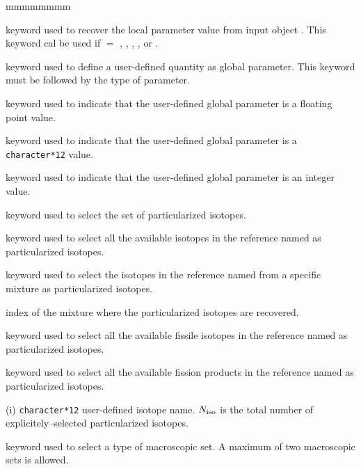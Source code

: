 \begin{ListeDeDescription}{mmmmmmmm}
\item[\moc{BURN}] keyword used to recover the local parameter value from input object .
This keyword cal be used if  $=$ , , , ,  or .

\item[\moc{VALE}] keyword used to define a user-defined quantity as global parameter.
This keyword must be followed by the type of parameter.

\item[\moc{FLOT}] keyword used to indicate that the user-defined global parameter
is a floating point value.

\item[\moc{CHAI}] keyword used to indicate that the user-defined global parameter
is a {\tt character*12} value.

\item[\moc{ENTI}] keyword used to indicate that the user-defined global parameter
is an integer value.

\item[\moc{ISOT}] keyword used to select the set of particularized isotopes.

\item[\moc{TOUT}] keyword used to select all the available isotopes in the reference
 named  as particularized isotopes.

\item[\moc{MILI}] keyword used to select the isotopes in the reference
 named  from a specific mixture as particularized isotopes.

\item[\dusa{imil}] index of the mixture where the particularized isotopes are recovered.

\item[\moc{FISS}] keyword used to select all the available fissile isotopes in the reference
 named  as particularized isotopes.

\item[\moc{PF}] keyword used to select all the available fission products in the reference
 named  as particularized isotopes.

\item[\dusa{HNAISO}(i)] {\tt character*12} user-defined isotope name. $N_{\rm iso}$ is the
total number of explicitely--selected particularized isotopes.

\item[\moc{MACR}] keyword used to select a type of macroscopic set. A maximum of two macroscopic sets is allowed.


\end{ListeDeDescription}
